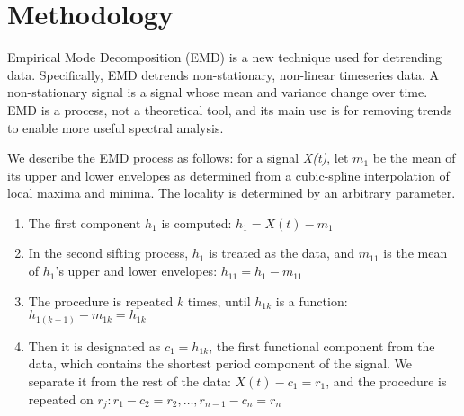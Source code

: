 


\section{Methodology}\label{method}

Empirical Mode Decomposition (EMD) \cite{huang:emd1998} is a new technique used for detrending data.
Specifically, EMD detrends non-stationary, non-linear timeseries data.  
A non-stationary signal is a signal whose mean and
variance change over time.  EMD is a process, not a theoretical tool, and its main use is for removing trends 
to enable more useful spectral analysis.

We describe the EMD process as follows:  for a signal \emph{X(t)}, let $m_1$ be the mean of its upper and
lower envelopes as determined from a cubic-spline interpolation of local maxima and minima. The locality 
is determined by an arbitrary parameter.

\begin{enumerate}
\item The first component $h_1$ is computed: $h_1=X(t)-m_1$
\item In the second sifting process, $h_1$ is treated as the data, and $m_{11}$ is the mean of $h_1$'s upper and lower envelopes: $h_{11}=h_1-m_{11}$
\item The procedure is repeated $k$ times, until $h_{1k}$ is a function: $h_{1(k-1)}-m_{1k}=h_{1k}$
\item Then it is designated as $c_1=h_{1k}$, the first functional component from the data, which contains the shortest period component of the signal. We separate it from the rest of the data: $X(t)-c_1 = r_1$, and the procedure is
repeated on $r_j: r_1-c_2 = r_2,\dots,r_{n-1} - c_n = r_n$
\end{enumerate}

